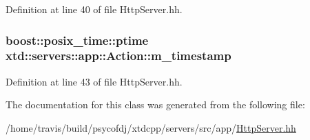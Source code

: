 Definition at line 40 of file Http\-Server.\-hh.

\hypertarget{classxtd_1_1servers_1_1app_1_1Action_a3baf29675a2f46cf5946816cf6c9b7b6}{
\subsubsection[{m\-\_\-timestamp}]{\setlength{\rightskip}{0pt plus 5cm}boost\-::posix\-\_\-time\-::ptime xtd\-::servers\-::app\-::\-Action\-::m\-\_\-timestamp}}\label{classxtd_1_1servers_1_1app_1_1Action_a3baf29675a2f46cf5946816cf6c9b7b6}


Definition at line 43 of file Http\-Server.\-hh.



The documentation for this class was generated from the following file\-:\begin{DoxyCompactItemize}
\item 
/home/travis/build/psycofdj/xtdcpp/servers/src/app/\hyperlink{HttpServer_8hh}{Http\-Server.\-hh}\end{DoxyCompactItemize}

